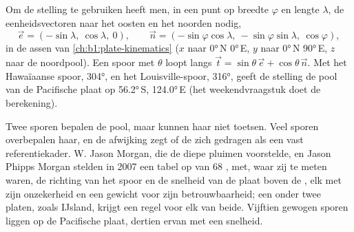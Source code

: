 Om de stelling te gebruiken heeft men, in een punt op breedte $\varphi$ en lengte
$\lambda$, de eenheidsvectoren naar het oosten en het noorden nodig,
\[
  \vec e = (-\sin\lambda,\ \cos\lambda,\ 0),\qquad
  \vec n = (-\sin\varphi\cos\lambda,\ -\sin\varphi\sin\lambda,\ \cos\varphi),
\]
in de assen van \cref{ch:b1:plate-kinematics} ($x$ naar \ang{0}\,N
\ang{0}\,E, $y$ naar \ang{0}\,N \ang{90}\,E, $z$ naar de noordpool). Een
spoor met  $\theta$ loopt langs $\vec t = \sin\theta\,\vec e +
\cos\theta\,\vec n$. Met het Hawaïaanse spoor,  \ang{304}, en het
Louisville-spoor,  \ang{316}, geeft de stelling de pool van de
Pacifische plaat op \ang{56.2}\,S, \ang{124.0}\,E (het weekendvraagstuk
doet de berekening).

Twee sporen bepalen de pool, maar kunnen haar niet toetsen. Veel sporen overbepalen haar, en de afwijking zegt of de  zich gedragen als een vast referentiekader. W. Jason Morgan, die de diepe pluimen voorstelde, en Jason Phipps Morgan stelden in 2007 een tabel op van 68 , met, waar zij te meten waren, de richting van het spoor en de snelheid van de plaat boven de , elk met zijn onzekerheid en een gewicht voor zijn betrouwbaarheid; een  onder twee platen, zoals IJsland, krijgt een regel voor elk van beide. Vijftien gewogen sporen liggen op de Pacifische plaat, dertien ervan met een snelheid.

